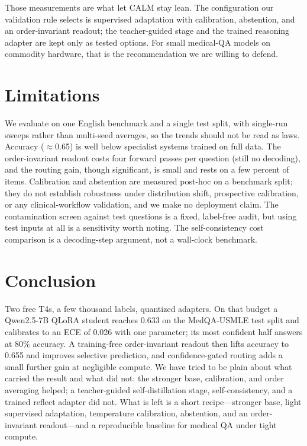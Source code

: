 \documentclass[conference]{IEEEtran}
\begin{document}
Those measurements are what let CALM stay lean. The configuration our validation rule selects is supervised adaptation with calibration, abstention, and an order-invariant readout; the teacher-guided stage and the trained reasoning adapter are kept only as tested options. For small medical-QA models on commodity hardware, that is the recommendation we are willing to defend.

\section{Limitations}
We evaluate on one English benchmark and a single test split, with single-run sweeps rather than multi-seed averages, so the trends should not be read as laws. Accuracy ($\approx$0.65) is well below specialist systems trained on full data. The order-invariant readout costs four forward passes per question (still no decoding), and the routing gain, though significant, is small and rests on a few percent of items. Calibration and abstention are measured post-hoc on a benchmark split; they do not establish robustness under distribution shift, prospective calibration, or any clinical-workflow validation, and we make no deployment claim. The contamination screen against test questions is a fixed, label-free audit, but using test inputs at all is a sensitivity worth noting. The self-consistency cost comparison is a decoding-step argument, not a wall-clock benchmark.

\section{Conclusion}
Two free T4s, a few thousand labels, quantized adapters. On that budget a Qwen2.5-7B QLoRA student reaches 0.633 on the MedQA-USMLE test split and calibrates to an ECE of 0.026 with one parameter; its most confident half answers at 80\% accuracy. A training-free order-invariant readout then lifts accuracy to 0.655 and improves selective prediction, and confidence-gated routing adds a small further gain at negligible compute. We have tried to be plain about what carried the result and what did not: the stronger base, calibration, and order averaging helped; a teacher-guided self-distillation stage, self-consistency, and a trained reflect adapter did not. What is left is a short recipe---stronger base, light supervised adaptation, temperature calibration, abstention, and an order-invariant readout---and a reproducible baseline for medical QA under tight compute.
\end{document}
